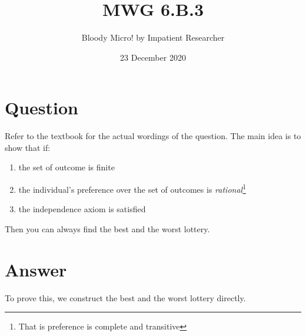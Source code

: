 \documentclass{tufte-handout}
\title{MWG 6.B.3}
\author{Bloody Micro! by Impatient Researcher}
\date{23 December 2020}  %
\begin{document}
\maketitle%


\section{Question}\label{sec:question}

Refer to the textbook for the actual wordings of the question. The main idea is to show that if:

\begin{enumerate}
  \item the set of outcome is finite
  \item the individual's preference over the set of outcomes is \textit{rational}\footnote{That is preference is complete and transitive}
  \item the independence axiom is satisfied
\end{enumerate}

\noindent Then you can always find the best and the worst lottery.

\section{Answer}\label{sec:answer}

To prove this, we construct the best and the worst lottery directly.
\end{document}
